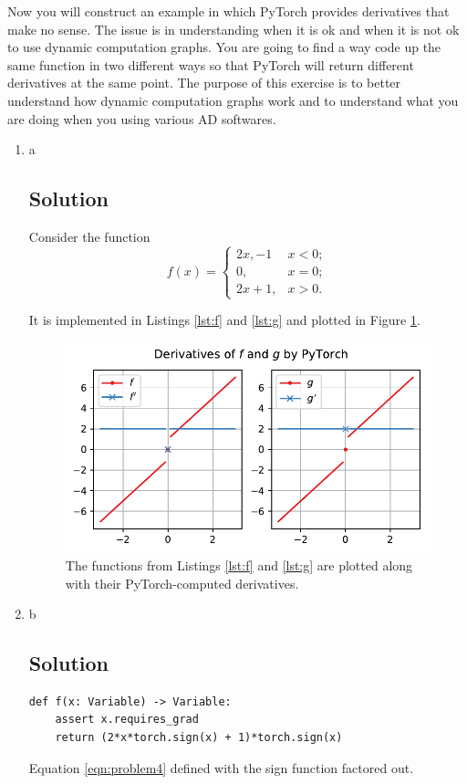 \documentclass[letterpaper,11pt]{article}
\begin{document}
Now you will construct an example in which PyTorch provides derivatives that
make no sense. The issue is in understanding when it is ok and when it is not ok
to use dynamic computation graphs. You are going to find a way code up the same
function in two different ways so that PyTorch will return different derivatives
at the same point. The purpose of this exercise is to better understand how
dynamic computation graphs work and to understand what you are doing when you
using various AD softwares.

\begin{enumerate}
\item a
  \subsection*{Solution}
  Consider the function
  \begin{equation}
    f(x) = \begin{cases}
      2x, - 1& x < 0; \\
      0, & x = 0; \\
      2x + 1, & x > 0.
    \end{cases}
    \label{eqn:problem4}
  \end{equation}

  It is implemented in Listings \ref{lst:f} and \ref{lst:g} and plotted in
  Figure \ref{fig:problem4}.

  \begin{figure}
    \centering
    \includegraphics{problem4/problem4.pdf}
    \caption{The functions from Listings \ref{lst:f} and \ref{lst:g} are plotted
      along with their PyTorch-computed derivatives.}
    \label{fig:problem4}
  \end{figure}
\item b
  \subsection*{Solution}
  \begin{listing}
\begin{verbatim}
def f(x: Variable) -> Variable:
    assert x.requires_grad
    return (2*x*torch.sign(x) + 1)*torch.sign(x)
\end{verbatim}
  \caption{Equation \ref{eqn:problem4} defined with the sign function factored out.}
\label{lst:f}
\end{listing}


\end{enumerate}
\end{document}
